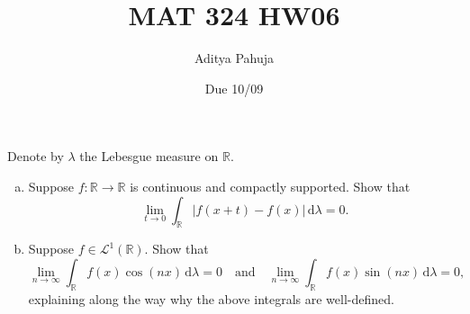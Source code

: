 \documentclass[10pt]{article}
\title{MAT 324 HW06}
\author{\large Aditya Pahuja}
\date{\large Due 10/09}
\newcommand{\dd}{\,\mathrm{d}}
\providecommand{\RR}{\mathbb R}
\providecommand{\ii}{\item}
\providecommand{\abs}[1]{\left\lvert #1\right\rvert}
\begin{document}
\maketitle

\begin{problem}
    Denote by $\lambda$ the Lebesgue measure on $\RR$.
    \begin{enumerate}[(a)]
        \ii Suppose $f\colon\RR\to\RR$ is continuous and compactly supported.
	Show that
	\begin{equation*}
	    \lim_{t\to0} \int_\RR \abs{f(x+t) - f(x)}\dd\lambda = 0.
	\end{equation*}
	\ii Suppose $f\in\mathcal L^1(\RR)$. Show that
	\begin{equation*}
	    \lim_{n\to\infty} \int_\RR f(x)\cos(nx)\dd\lambda = 0
	    \quad\text{and}\quad
	    \lim_{n\to\infty} \int_\RR f(x)\sin(nx)\dd\lambda = 0,
	\end{equation*}
	explaining along the way why the above integrals are well-defined.
    \end{enumerate}
\end{problem}
\end{document}
